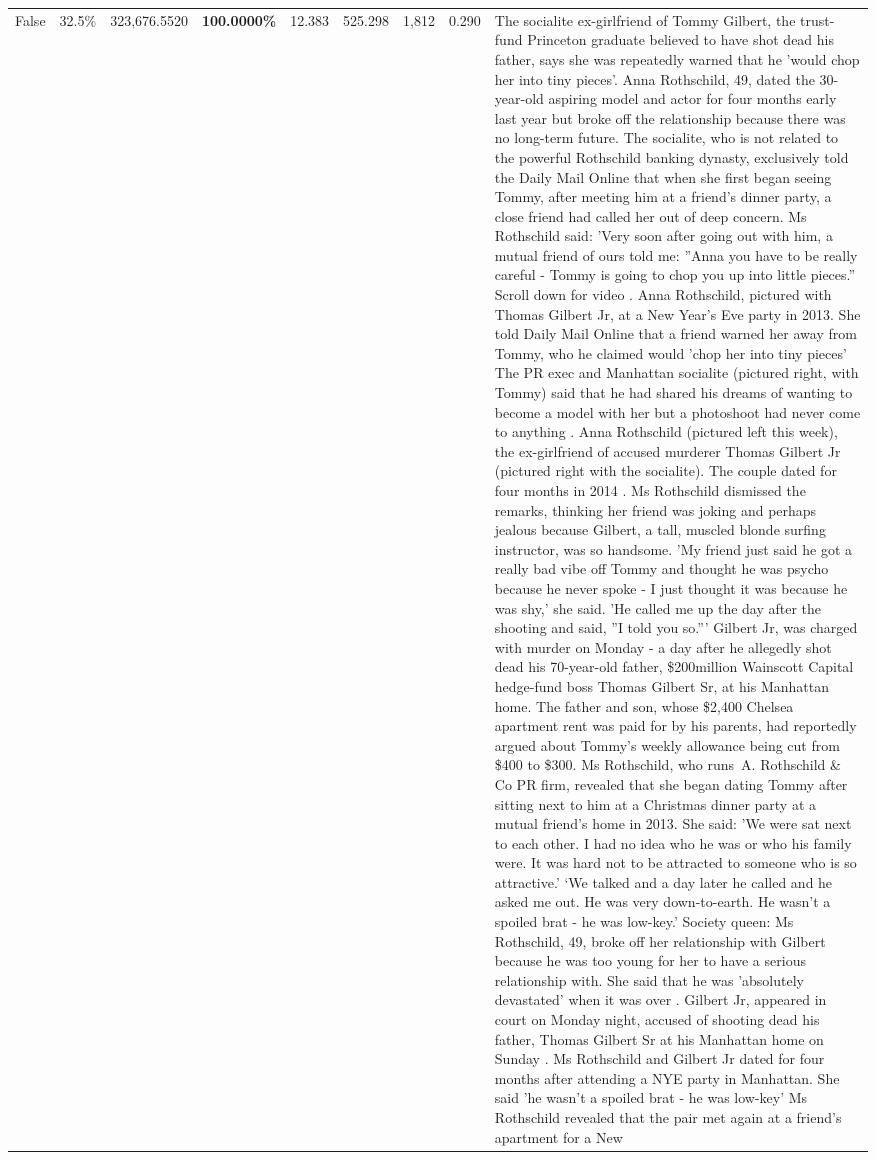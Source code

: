 \begin{table}[H]
\begin{tabular}{lllrlllll}
False & 32.5\% & 323,676.5520 & \bfseries \color{red} 100.0000\% & 12.383 & 525.298 & 1,812 & 0.290 & The socialite ex-girlfriend of Tommy Gilbert, the trust-fund Princeton graduate believed to have shot dead his father, says she was repeatedly warned that he 'would chop her into tiny pieces'. Anna Rothschild, 49, dated the 30-year-old aspiring model and actor for four months early last year but broke off the relationship because there was no long-term future. The socialite, who is not related to the powerful Rothschild banking dynasty, exclusively told the Daily Mail Online that when she first began seeing Tommy, after meeting him at a friend's dinner party, a close friend had called her out of deep concern. Ms Rothschild said: 'Very soon after going out with him, a mutual friend of ours told me: ''Anna you have to be really careful - Tommy is going to chop you up into little pieces.'' Scroll down for video . Anna Rothschild, pictured with Thomas Gilbert Jr, at a New Year's Eve party in 2013. She told Daily Mail Online that a friend warned her away from Tommy, who he claimed would 'chop her into tiny pieces' The PR exec and Manhattan socialite (pictured right, with Tommy) said that he had shared his dreams of wanting to become a model with her but a photoshoot had never come to anything . Anna Rothschild (pictured left this week), the ex-girlfriend of accused murderer Thomas Gilbert Jr (pictured right with the socialite). The couple dated for four months in 2014 . Ms Rothschild dismissed the remarks, thinking her friend was joking and perhaps jealous because Gilbert, a tall, muscled blonde surfing instructor, was so handsome. 'My friend just said he got a really bad vibe off Tommy and thought he was psycho because he never spoke - I just thought it was because he was shy,' she said. 'He called me up the day after the shooting and said, ''I told you so.''' Gilbert Jr, was charged with murder on Monday - a day after he allegedly shot dead his 70-year-old father, \$200million Wainscott Capital hedge-fund boss Thomas Gilbert Sr, at his Manhattan home. The father and son, whose \$2,400 Chelsea apartment rent was paid for by his parents, had reportedly argued about Tommy's weekly allowance being cut from \$400 to \$300. Ms Rothschild, who runs A. Rothschild \& Co PR firm, revealed that she began dating Tommy after sitting next to him at a Christmas dinner party at a mutual friend's home in 2013. She said: 'We were sat next to each other. I had no idea who he was or who his family were. It was hard not to be attracted to someone who is so attractive.' ‘We talked and a day later he called and he asked me out. He was very down-to-earth. He wasn’t a spoiled brat - he was low-key.’ Society queen: Ms Rothschild, 49, broke off her relationship with Gilbert because he was too young for her to have a serious relationship with. She said that he was 'absolutely devastated' when it was over . Gilbert Jr, appeared in court on Monday night, accused of shooting dead his father, Thomas Gilbert Sr at his Manhattan home on Sunday . Ms Rothschild and Gilbert Jr dated for four months after attending a NYE party in Manhattan. She said 'he wasn't a spoiled brat - he was low-key' Ms Rothschild revealed that the pair met again at a friend’s apartment for a New 
\end{tabular}
\end{table}
